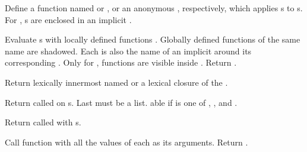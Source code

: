 \begin{LIST}{1cm}

  {
  Define a function named  or , or an anonymous , respectively, which applies
  s to s. For , s are
  enclosed in an implicit  .
  }

  {
  Evaluate s with
  locally defined functions . Globally defined functions of
  the same name are shadowed. Each  is also the name of an
  implicit  around its corresponding .
  Only for , functions  are visible inside
  . Return . 
  }

  {
    Return lexically innermost  named  or a
    lexical closure of the .
  }

  {
  Return  called on
  s. Last  must be a list. able if
   is one of , , and .
  }

  {
  Return  called with s.
  }

  {Call function
   with all the values of each  as its arguments.  Return
  .
  }


\end{LIST}
